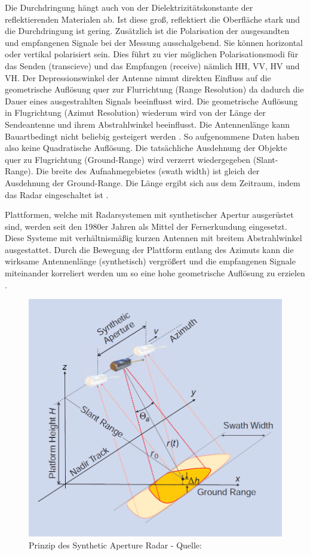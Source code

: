 Die Durchdringung hängt auch von der Dielektrizitätskonstante der reflektierenden Materialen ab. Ist diese groß, reflektiert die Oberfläche stark und die Durchdringung ist gering.
Zusätzlich ist die Polarisation der ausgesandten und empfangenen Signale bei der Messung ausschalgebend. Sie können horizontal oder vertikal polarisiert sein. Dies führt zu vier möglichen 
Polarisationsmodi für das Senden (transcieve) und das Empfangen (receive) nämlich HH, VV, HV und VH.
Der Depressionswinkel der Antenne nimmt direkten Einfluss auf die geometrische Auflösung quer zur Flurrichtung (Range Resolution) da dadurch die Dauer eines ausgestrahlten Signals
beeinflusst wird. Die geometrische Auflösung in Flugrichtung (Azimut Resolution) wiederum wird von der Länge der Sendeantenne und ihrem Abstrahlwinkel beeinflusst. Die Antennenlänge kann Bauartbedingt 
nicht beliebig gesteigert werden \cite{einfuehrung_in_fernerkundung}. So aufgenommene Daten haben also keine Quadratische Auflösung. Die tatsächliche Ausdehnung der Objekte quer zu Flugrichtung (Ground-Range) 
wird verzerrt wiedergegeben (Slant-Range). Die breite des Aufnahmegebietes (swath width) ist gleich der Ausdehnung der Ground-Range. Die Länge ergibt sich aus dem Zeitraum, indem das Radar eingeschaltet ist \cite{tutorial_on_sar}.

Plattformen, welche mit Radarsystemen mit synthetischer Apertur ausgerüstet sind, werden seit den 1980er Jahren als 
Mittel der Fernerkundung eingesetzt. Diese Systeme mit verhältnismäßig kurzen Antennen mit breitem Abstrahlwinkel ausgestattet. Durch die Bewegung der Plattform entlang 
des Azimuts kann die wirksame Antennenlänge (synthetisch) vergrößert und die empfangenen Signale miteinander korreliert werden um so eine hohe geometrische Auflösung zu erzielen \cite{tutorial_on_sar}\cite{einfuehrung_in_fernerkundung}.

\begin{figure}[h]
    \centering
    \includegraphics[width=12cm]{Bilder/SAR_Prinzip.png}
    \caption{Prinzip des Synthetic Aperture Radar - Quelle: \cite{tutorial_on_sar}}
    \label{fig:sar_prinzip}
\end{figure}

